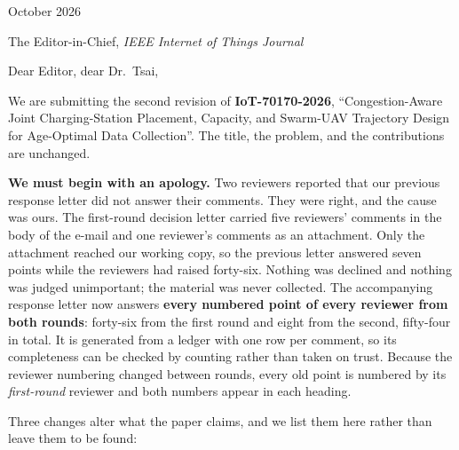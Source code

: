 \documentclass[11pt]{article}
\begin{document}
\thispagestyle{empty}

\begin{flushright}
October 2026
\end{flushright}

\vspace{-1em}

\noindent
The Editor-in-Chief, \textit{IEEE Internet of Things Journal}

\vspace{0.6em}

\noindent
Dear Editor, dear Dr.~Tsai,

We are submitting the second revision of \textbf{IoT-70170-2026},
``Congestion-Aware Joint Charging-Station Placement, Capacity, and Swarm-UAV
Trajectory Design for Age-Optimal Data Collection''. The title, the problem, and the
contributions are unchanged.

\textbf{We must begin with an apology.} Two reviewers reported that our previous
response letter did not answer their comments. They were right, and the cause was
ours. The first-round decision letter carried five reviewers' comments in the body of
the e-mail and one reviewer's comments as an attachment. Only the attachment reached
our working copy, so the previous letter answered seven points while the reviewers had
raised forty-six. Nothing was declined and nothing was judged unimportant; the
material was never collected. The accompanying response letter now answers
\textbf{every numbered point of every reviewer from both rounds}: forty-six from the
first round and eight from the second, fifty-four in total. It is generated from a
ledger with one row per comment, so its completeness can be checked by counting rather
than taken on trust. Because the reviewer numbering changed between rounds, every old
point is numbered by its \emph{first-round} reviewer and both numbers appear in each
heading.

Three changes alter what the paper claims, and we list them here rather than leave
them to be found:
\end{document}
